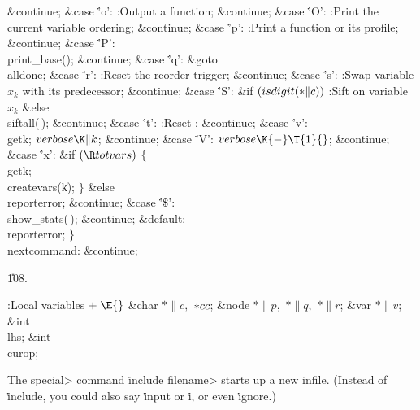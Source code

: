 \&{continue};\6
\4\&{case} \.{'o'}:\5
:Output a function\X;\5
\&{continue};\6
\4\&{case} \.{'O'}:\5
:Print the current variable ordering\X;\5
\&{continue};\6
\4\&{case} \.{'p'}:\5
:Print a function or its profile\X;\5
\&{continue};\6
\4\&{case} \.{'P'}:\5
\\{print\_base}();\5
\&{continue};\6
\4\&{case} \.{'q'}:\5
\&{goto} \\{alldone};\6
\4\&{case} \.{'r'}:\5
:Reset the reorder trigger\X;\5
\&{continue};\6
\4\&{case} \.{'s'}:\5
:Swap variable $x_k$ with its predecessor\X;\5
\&{continue};\6
\4\&{case} \.{'S'}:\6
\&{if} ${}(\\{isdigit}({*}\|c)){}$\1\5
:Sift on variable $x_k$\X\2\6
\&{else}\1\5
\\{siftall}(\,);\5
\2\&{continue};\6
\4\&{case} \.{'t'}:\5
:Reset \X;\5
\&{continue};\6
\4\&{case} \.{'v'}:\5
\\{getk};\5
${}\\{verbose}\K\|k{}$;\5
\&{continue};\6
\4\&{case} \.{'V'}:\5
${}\\{verbose}\K{-}\T{1}{}$;\5
\&{continue};\6
\4\&{case} \.{'x'}:\6
\&{if} ${}(\R\\{totvars}){}$\5
${}\{{}$\5
\1\\{getk};\5
\\{createvars}(\|k);\6
\4${}\}{}$\5
\2\&{else}\1\5
\\{reporterror};\5
\2\&{continue};\6
\4\&{case} \.{'\$'}:\5
\\{show\_stats}(\,);\5
\&{continue};\6
\4\&{default}:\5
\\{reporterror};\6
\4${}\}{}$\2\6
\4\\{nextcommand}:\5
\&{continue};\par
\U108.\fi

\B{}:Local variables\X${}\mathrel+\E{}$\6
\&{char} ${}{*}\|c,{}$ ${}{*}\\{cc}{}$;\6
\&{node} ${}{*}\|p,{}$ ${}{*}\|q,{}$ ${}{*}\|r{}$;\6
\&{var} ${}{*}\|v{}$;\6
\&{int} \\{lhs};\6
\&{int} \\{curop};\par
\fi

The \<special> command \.{include} \<filename> starts up a
new infile.
(Instead of \.{include}, you could also say \.{input} or \.i, or
even \.{ignore}.)


